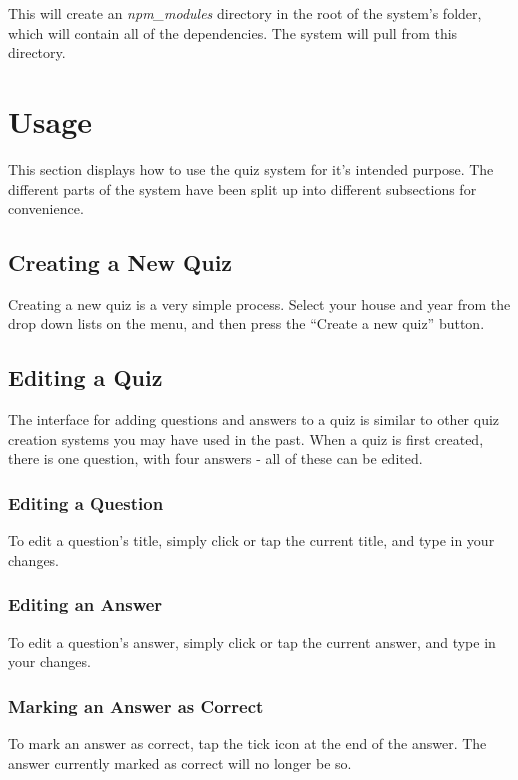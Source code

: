 This will create an \textit{npm_modules} directory in the root of the system's folder, which will contain all of the dependencies. The system will pull from this directory.


\section{Usage} %
\label{sec:usage}
This section displays how to use the quiz system for it's intended purpose. The different parts of the system have been split up into different subsections for convenience.

\subsection{Creating a New Quiz} %
\label{sub:creating_a_quiz}
Creating a new quiz is a very simple process. Select your house and year from the drop down lists on the menu, and then press the ``Create a new quiz'' button.

\subsection{Editing a Quiz} %
\label{sub:editing_a_quiz}
The interface for adding questions and answers to a quiz is similar to other quiz creation systems you may have used in the past. When a quiz is first created, there is one question, with four answers - all of these can be edited.

\subsubsection{Editing a Question} %
\label{ssub:editing_a_question}
To edit a question's title, simply click or tap the current title, and type in your changes.

\subsubsection{Editing an Answer} %
\label{ssub:editing_an_answer}
To edit a question's answer, simply click or tap the current answer, and type in your changes.

\subsubsection{Marking an Answer as Correct} %
\label{ssub:marking_an_answer_as_correct}
To mark an answer as correct, tap the tick icon at the end of the answer. The answer currently marked as correct will no longer be so.

